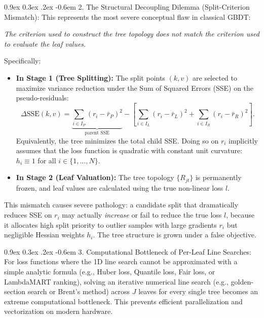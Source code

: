 \documentclass[11pt,a4paper]{article}
\makeatletter
\renewcommand\paragraph{\@startsection{paragraph}{4}{\z@}%
                                     {0.9ex \@plus0.3ex \@minus.2ex}%
                                     {-0.6em}%
                                     {\normalfont\normalsize\bfseries}}
\makeatother
\begin{document}
\paragraph{2. The Structural Decoupling Dilemma (Split-Criterion Mismatch):}
This represents the most severe conceptual flaw in classical GBDT:
\begin{center}
    \emph{The criterion used to construct the tree topology does not match the criterion used to evaluate the leaf values.}
\end{center}
Specifically:
\begin{itemize}
    \item \textbf{In Stage 1 (Tree Splitting):} The split points $(k, v)$ are selected to maximize variance reduction under the Sum of Squared Errors (SSE) on the pseudo-residuals:
    \begin{equation}
        \Delta \text{SSE}(k,v) = \underbrace{\sum_{i \in I_P} (r_i - \bar{r}_P)^2}_{\text{parent SSE}} - \left[ \sum_{i \in I_L} (r_i - \bar{r}_L)^2 + \sum_{i \in I_R} (r_i - \bar{r}_R)^2 \right].
    \end{equation}
    Equivalently, the tree minimizes the total child SSE. Doing so on $r_i$ implicitly assumes that the loss function is quadratic with constant unit curvature: $h_i \equiv 1$ for all $i \in \{1, \dots, N\}$.
    \item \textbf{In Stage 2 (Leaf Valuation):} The tree topology $\{R_{jt}\}$ is permanently frozen, and leaf values are calculated using the true non-linear loss $l$.
\end{itemize}
This mismatch causes severe pathology: a candidate split that dramatically reduces SSE on $r_i$ may actually \emph{increase} or fail to reduce the true loss $l$, because it allocates high split priority to outlier samples with large gradients $r_i$ but negligible Hessian weights $h_i$. The tree structure is grown under a false objective.

\paragraph{3. Computational Bottleneck of Per-Leaf Line Searches:}
For loss functions where the 1D line search cannot be approximated with a simple analytic formula (e.g., Huber loss, Quantile loss, Fair loss, or LambdaMART ranking), solving an iterative numerical line search (e.g., golden-section search or Brent's method) across $J$ leaves for every single tree becomes an extreme computational bottleneck. This prevents efficient parallelization and vectorization on modern hardware.
\end{document}
